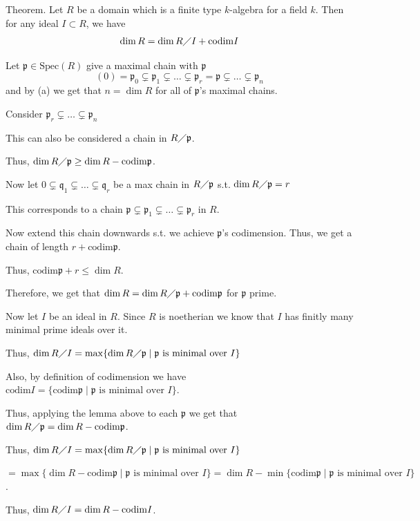 \documentclass[12pt, letterpaper]{article}
\newcommand{\p}{\mathfrak{p}}
\renewcommand{\t}[1]{\text{#1}}
\newcommand{\Spec}{\mathrm{Spec}}
\newcommand{\mf}[1]{\mathfrak{#1}}
\newcommand{\codim}{\mathrm{codim}}
\begin{document}
\color{\TextColor}
\pagecolor{\colormode}
\setlength{\parindent}{0pt}
\pagestyle{fancy}
\fancyhf{}

\qh
\addtocounter{subproblemcounter}{1}
\begin{subproblem}{}
    Theorem. Let $R$ be a domain which is a finite type $k$-algebra for a field $k$. Then for
any ideal $I \subset R$, we have
\[\dim R = \dim R \diagup I + \codim I\]
\end{subproblem}
\begin{problemproof}
    Let $\p \in \Spec(R)$ give a maximal chain with $\p$
    \[(0)=\p_0 \subsetneq \p_1 \subsetneq \dots \subsetneq \p_r=\p \subsetneq \dots \subsetneq \p_n\]
    and by (a) we get that $n=\dim R$ for all of $\p$'s maximal chains.

    Consider $\p_r \subsetneq \dots \subsetneq \p_n$

    This can also be considered a chain in $R \diagup \p$.

    Thus, $\dim R \diagup \p \geq \dim R - \codim \p$.

    Now let $0 \subsetneq \mf{q}_1 \subsetneq \dots \subsetneq \mf{q}_r$ be a max chain in $R \diagup \p$ s.t. $\dim R \diagup \p = r$

    This corresponds to a chain $\p \subsetneq \p_1 \subsetneq \dots \subsetneq \p_r$ in $R$.

    Now extend this chain downwards s.t. we achieve $\p$'s codimension. Thus, we get a chain of length $r+\codim \p$.

    Thus, $\codim \p + r \leq \dim R$.

    Therefore, we get that $\dim R = \dim R \diagup \p + \codim \p$ for $\p$ prime.

    Now let $I$ be an ideal in $R$. Since $R$ is noetherian we know that $I$ has finitly many minimal prime ideals over it.

    Thus, $\dim R \diagup I = \max \{\dim R \diagup \p \mid \p \t{ is minimal over } I\}$

    Also, by definition of codimension we have $\codim I = \{\codim \p \mid \p \t{ is minimal over } I\}$.

    Thus, applying the lemma above to each $\p$ we get that $\dim R \diagup \p = \dim R - \codim \p$.

    Thus, $\dim R \diagup I = \max \{\dim R \diagup \p \mid \p \t{ is minimal over } I\}$

    $=\max \{\dim R - \codim  \p \mid \p \t{ is minimal over } I\} = \dim R - \min \{\codim \p \mid \p \t{ is minimal over } I\}$.

    Thus, $\dim R \diagup I = \dim R - \codim I$.
\end{problemproof}
\end{document}
